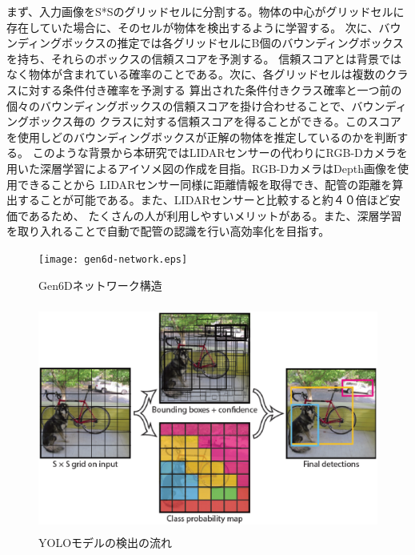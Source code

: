 まず、入力画像をS*Sのグリッドセルに分割する。物体の中心がグリッドセルに存在していた場合に、そのセルが物体を検出するように学習する。
次に、バウンディングボックスの推定では各グリッドセルにB個のバウンディングボックスを持ち、それらのボックスの信頼スコアを予測する。
信頼スコアとは背景ではなく物体が含まれている確率のことである。次に、各グリッドセルは複数のクラスに対する条件付き確率を予測する
算出された条件付きクラス確率と一つ前の個々のバウンディングボックスの信頼スコアを掛け合わせることで、バウンディングボックス毎の
クラスに対する信頼スコアを得ることができる。このスコアを使用しどのバウンディングボックスが正解の物体を推定しているのかを判断する。
このような背景から本研究ではLIDARセンサーの代わりにRGB-Dカメラを用いた深層学習によるアイソメ図の作成を目指。RGB-DカメラはDepth画像を使用できることから
LIDARセンサー同様に距離情報を取得でき、配管の距離を算出することが可能である。また、LIDARセンサーと比較すると約４０倍ほど安価であるため、
たくさんの人が利用しやすいメリットがある。また、深層学習を取り入れることで自動で配管の認識を行い高効率化を目指す。
\begin{figure}[htbt]
	\centering
	 \texttt{[image: gen6d-network.eps]}
	 \caption{Gen6Dネットワーク構造}
	 \label{fig:f2}
\end{figure}

\begin{figure}[htbt]
	\centering
	 \includegraphics[height=75mm]{yolo.eps}
	 \caption{YOLOモデルの検出の流れ}
	 \label{fig:f2}
\end{figure}

